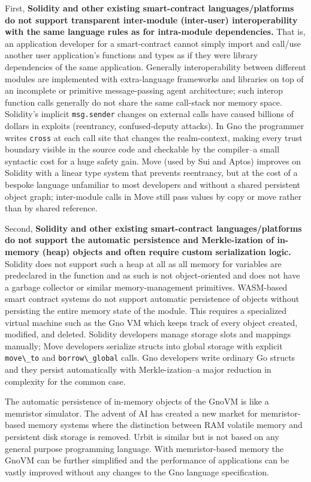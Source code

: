 \documentclass[12pt,a4paper]{article}
\newcommand{\passthrough}[1]{#1}
\begin{document}
First, \textbf{Solidity and other existing smart-contract
languages/platforms do not support transparent inter-module (inter-user)
interoperability with the same language rules as for intra-module
dependencies.} That is, an application developer for a smart-contract
cannot simply import and call/use another user application's functions
and types as if they were library dependencies of the same application.
Generally interoperability between different modules are implemented
with extra-language frameworks and libraries on top of an incomplete or
primitive message-passing agent architecture; such interop function
calls generally do not share the same call-stack nor memory space.
Solidity's implicit \passthrough{\lstinline!msg.sender!} changes on
external calls have caused billions of dollars in exploits (reentrancy,
confused-deputy attacks). In Gno the programmer writes
\passthrough{\lstinline!cross!} at each call site that changes the
realm-context, making every trust boundary visible in the source code
and checkable by the compiler--a small syntactic cost for a huge safety
gain. Move (used by Sui and Aptos) improves on Solidity with a linear
type system that prevents reentrancy, but at the cost of a bespoke
language unfamiliar to most developers and without a shared persistent
object graph; inter-module calls in Move still pass values by copy or
move rather than by shared reference.

Second, \textbf{Solidity and other existing smart-contract
languages/platforms do not support the automatic persistence and
Merkle-ization of in-memory (heap) objects and often require custom
serialization logic.} Solidity does not support such a heap at all as
all memory for variables are predeclared in the function and as such is
not object-oriented and does not have a garbage collector or similar
memory-management primitives. WASM-based smart contract systems do not
support automatic persistence of objects without persisting the entire
memory state of the module. This requires a specialized virtual machine
such as the Gno VM which keeps track of every object created, modified,
and deleted. Solidity developers manage storage slots and mappings
manually; Move developers serialize structs into global storage with
explicit \passthrough{\lstinline!move\_to!} and
\passthrough{\lstinline!borrow\_global!} calls. Gno developers write
ordinary Go structs and they persist automatically with
Merkle-ization--a major reduction in complexity for the common case.

The automatic persistence of in-memory objects of the GnoVM is like a
memristor simulator. The advent of AI has created a new market for
memristor-based memory systems where the distinction between RAM
volatile memory and persistent disk storage is removed. Urbit is similar
but is not based on any general purpose programming language. With
memristor-based memory the GnoVM can be further simplified and the
performance of applications can be vastly improved without any changes
to the Gno language specification.
\end{document}
